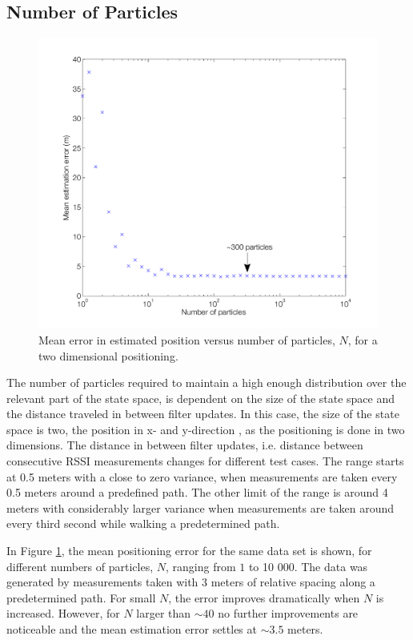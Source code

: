 \documentclass{LTHthesis}
\begin{document}
\subsection{Number of Particles}
%
\begin{figure}[!hbt]

\includegraphics[width=1\textwidth ]{images/pure_rssi/err_vs_N}
\caption{Mean error in estimated position versus number of particles, $N$, for a two dimensional positioning.}\label{err_vs_N}
\end{figure}

The number of particles required to maintain a high enough distribution over the relevant part of the state space, is dependent on the size of the state space and the distance traveled in between filter updates. In this case, the size of the state space is two, the position in x- and y-direction , as the positioning is done in two dimensions. The distance in between filter updates, i.e. distance between consecutive RSSI measurements changes for different test cases. The range starts at 0.5 meters with a close to zero variance, when measurements are taken every 0.5 meters around a predefined path. The other limit of the range is around 4 meters with considerably larger variance when measurements are taken around every third second while walking a predetermined path. 

In Figure \ref{err_vs_N}, the mean positioning error for the same data set is shown, for different numbers of particles, $N$, ranging from $1$ to 10 000. The data was generated by measurements taken with 3 meters of relative spacing along a predetermined path. For small $N$, the error improves dramatically when $N$ is increased. However, for $N$ larger than $\sim 40$ no further improvements are noticeable and the mean estimation error settles at $\sim 3.5$ meters. 
\end{document}
